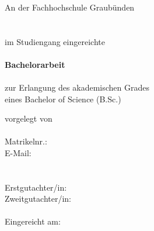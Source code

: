 \begin{titlepage}
    \begin{center}
        {\large
            {\Large\textbf{\haupttitel}} \\
            \textit{\untertitel} \\
            ~\\
            An der Fachhochschule Graubünden \\
            \department \\
            \institute \\
            \vspace{2mm}
            im Studiengang \studiengang{} eingereichte \\
            ~\\
            {\Huge\textbf{Bachelorarbeit}} \\
            ~\\
            zur Erlangung des akademischen Grades \\
            eines Bachelor of Science (B.Sc.)
    
            \vspace{40mm}
            vorgelegt von \\
            \vspace{4mm}
            {\Large\textbf{\autorenschaft}} \\
            \vspace{4mm}
            Matrikelnr.: \matrikelnummer \\
            E-Mail: \email \\
            ~\\~\\
            Erstgutachter/in:  \\
            Zweitgutachter/in: \coRefe \\
            ~\\
            Eingereicht am: \abgabedatum
        } %
    \end{center}
\end{titlepage}
